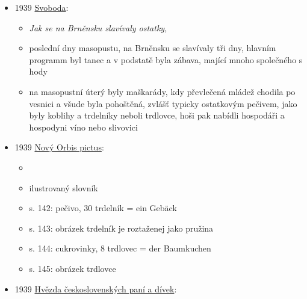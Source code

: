 \begin{itemize}
  \begin{itemize}
  \tightlist
  \item
    č. 270, 29. 5., s. 6
  \item
    \emph{Dobrá domácnost: pohostinství na venku},
  \item
    radí lidem z regionů, aby návštěvám připravovali tradiční lokální
    jídla, třeba na Slovensku chřuplavé pagáčky, nebo dokonce slavné
    skalické trdelníky, které se otáčejí navinuté na válečku a takto nad
    otevřeným ohněm se do růžova pečou, obsypané mandlemi
  \end{itemize}
\item
  1939
  \href{https://www.digitalniknihovna.cz/vkol/uuid/uuid:c4410d8f-1826-4dfb-b3a8-765a4512eba6}{Svoboda}:

  \begin{itemize}
  \tightlist
  \item
    \emph{Jak se na Brněnsku slavívaly ostatky},
  \item
    poslední dny masopustu, na Brněnsku se slavívaly tři dny, hlavním
    programm byl tanec a v podstatě byla zábava, mající mnoho společného
    s hody
  \item
    na masopustní úterý byly maškarády, kdy převlečená mládež chodila po
    vesnici a všude byla pohoštěná, zvlášť typicky ostatkovým pečivem,
    jako byly koblihy a trdelníky neboli trdlovce, hoši pak nabídli
    hospodáři a hospodyni víno nebo slivovici
  \end{itemize}
\item
  1939
  \href{https://www.digitalniknihovna.cz/mzk/uuid/uuid:32e08b20-fe64-11e6-aa6c-005056827e52}{Nový
  Orbis pictus}:

  \begin{itemize}
  \tightlist
  \item
  \item
    ilustrovaný slovník
  \item
    s. 142: pečivo, 30 trdelník = ein Gebäck
  \item
    s. 143: obrázek trdelník je roztaženej jako pružina
  \item
    s. 144: cukrovinky, 8 trdlovec = der Baumkuchen
  \item
    s. 145: obrázek trdlovce
  \end{itemize}
\item
  1939
  \href{https://ceskadigitalniknihovna.cz/uuid/uuid:58db1e00-548d-4378-8d2f-69c0656a1147}{Hvězda
  československých paní a dívek}:


\end{itemize}
